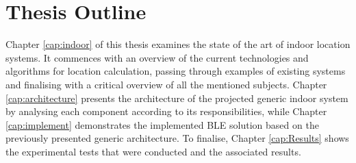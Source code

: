 \section{Thesis Outline}
\label{sec:int_outline}

Chapter \ref{cap:indoor} of this thesis examines the state of the art of indoor location systems. It commences with an overview of the current technologies and algorithms for location calculation, passing through examples of existing systems and finalising with a critical overview of all the mentioned subjects.
Chapter \ref{cap:architecture} presents the architecture of the projected generic indoor system by analysing each component according to its responsibilities, while Chapter \ref{cap:implement} demonstrates the implemented \ac{BLE} solution based on the previously presented generic architecture. 
To finalise, Chapter \ref{cap:Results} shows the experimental tests that were conducted and the associated results.